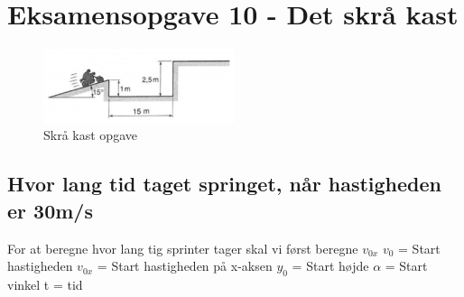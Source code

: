 \newpage
\section{Eksamensopgave 10 - Det skrå kast}
\begin{figure}[h!]
    \centering
    \includegraphics[width=0.5\textwidth]{figures/skrakast.png}
    \caption{Skrå kast opgave}
\end{figure}
\subsection{Hvor lang tid taget springet, når hastigheden er 30m/s}
For at beregne hvor lang tig sprinter tager skal vi først beregne \begin{math}v_{0x}\end{math}\newline
\begin{math}v_{0}\end{math} = Start hastigheden\newline
\begin{math}v_{0x}\end{math} = Start hastigheden på x-aksen\newline
\begin{math}y_{0}\end{math} = Start højde\newline
\begin{math}\alpha\end{math} = Start vinkel\newline
t = tid

